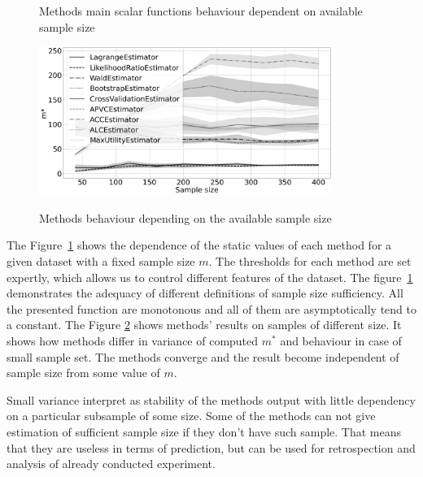 \documentclass[
11pt,%
tightenlines,%
twoside,%
onecolumn,%
nofloats,%
nobibnotes,%
nofootinbib,%
superscriptaddress,%
noshowpacs,%
centertags]%
{revtex4}
\begin{document}
\begin{figure}[h!]
    \caption{Methods main scalar functions behaviour dependent on available sample size}
    \label{fig1}
\end{figure}

\begin{figure}[h!t]\center
    {\includegraphics[width=0.85\textwidth]{graphs.png}}
    \caption{Methods behaviour depending on the available sample size}
    \label{fig2}
\end{figure}
    
The Figure~\ref{fig1} shows the dependence of the static values of each method for a given dataset with a fixed sample size $m$. The thresholds for each method are set expertly, which allows us to control different features of the dataset. The figure~\ref{fig1} demonstrates the adequacy of different definitions of sample size sufficiency. All the presented function are monotonous and all of them are asymptotically tend to a constant.
The Figure \ref{fig2} shows methods' results on samples of different size. It shows how methods differ in variance of computed $m^*$ and behaviour in case of small sample set. The methods converge and the result become independent of sample size from some value of $m$. 
    
Small variance interpret as stability of the methods output with little dependency on a particular subsample of some size. Some of the methods can not give estimation of sufficient sample size if they don't have such sample. That means that they are useless in terms of prediction, but can be used for retrospection and analysis of already conducted experiment.
\end{document}
